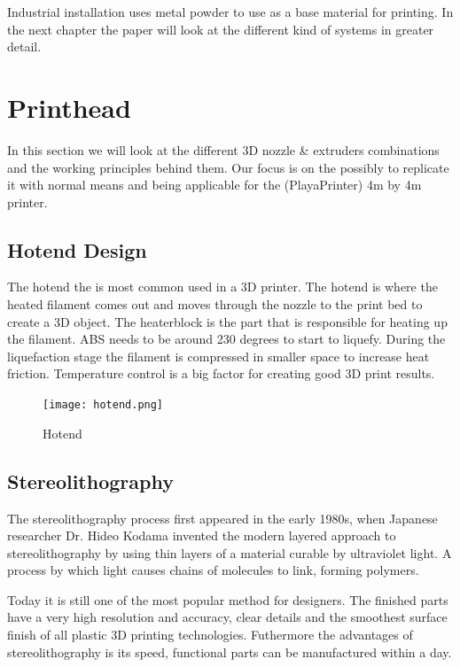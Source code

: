 \documentclass[11pt]{article}
\begin{document}
Industrial installation uses metal powder to use as a base material for printing. In the next chapter the paper will look at the different kind of systems in greater detail.  

\newpage
\section{Printhead}

In this section we will look at the different 3D nozzle \& extruders combinations and the working principles behind them. Our focus is on the possibly to replicate it with normal means and being applicable for the (PlayaPrinter) 4m by 4m printer. 



\subsection{Hotend Design}

The hotend the is most common used in a 3D printer. The hotend is where the heated filament comes 
out and moves through the nozzle to the print bed to create a 3D object. The heaterblock is the part that is responsible for heating up the filament. ABS needs to be around 230 degrees to start to liquefy. During the liquefaction stage the filament is compressed in smaller space to increase heat friction. Temperature control is a big factor for creating good 3D print results. 

\begin{figure}[hbtp]
\caption{Hotend }
\centering
\texttt{[image: hotend.png]}
\end{figure}

\subsection{Stereolithography  } 
The stereolithography  process first appeared in the early 1980s, when Japanese researcher Dr. Hideo Kodama invented the modern layered approach to stereolithography by using thin layers of a material curable by ultraviolet light. A process by which light causes chains of molecules to link, forming polymers.


  Today it is still one of the most popular method for designers. The finished parts have a very high resolution and accuracy, clear details and the smoothest surface finish of all plastic 3D printing technologies. Futhermore  the advantages of stereolithography is its speed, functional parts can be manufactured within a day.
\end{document}
